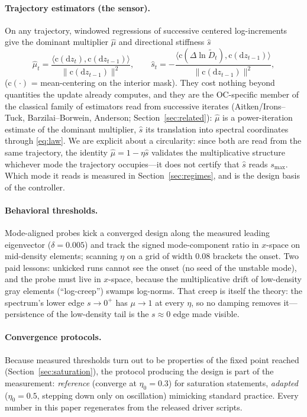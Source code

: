 \documentclass[11pt,a4paper]{article}
\newcommand{\smax}{s_{\max}}
\newcommand{\Dfilt}{\tilde{D}}
\newcommand{\muh}{\hat{\mu}}
\newcommand{\sh}{\hat{s}}
\begin{document}
\paragraph{Trajectory estimators (the sensor).} On any trajectory,
windowed regressions of successive centered log-increments give the
dominant multiplier $\muh$ and directional stiffness $\sh$
\begin{equation}
  \muh_t = \frac{\langle \mathrm c(\mathrm dz_t),\mathrm
  c(\mathrm dz_{t-1})\rangle}{\|\mathrm c(\mathrm dz_{t-1})\|^2},
  \qquad
  \sh_t = -\frac{\langle \mathrm c(\Delta\ln\Dfilt_t),\mathrm
  c(\mathrm dz_{t-1})\rangle}{\|\mathrm c(\mathrm dz_{t-1})\|^2},
  \label{eq:estimators}
\end{equation}
($\mathrm c(\cdot)$ = mean-centering on the interior mask). They cost
nothing beyond quantities the update already computes, and they are the
OC-specific member of the classical family of estimators read from
successive iterates (Aitken/Irons--Tuck, Barzilai--Borwein, Anderson;
Section~\ref{sec:related}): $\muh$ is a power-iteration estimate of the
dominant multiplier, $\sh$ its translation into spectral coordinates
through \eqref{eq:law}. We are explicit
about a circularity: since both are read from the same trajectory, the
identity $\muh=1-\eta\sh$ validates the multiplicative structure
whichever mode the trajectory occupies---it does not certify that $\sh$
reads $\smax$. Which mode it reads is measured in
Section~\ref{sec:regimes}, and is the design basis of the controller.

\paragraph{Behavioral thresholds.} Mode-aligned probes kick a converged
design along the measured leading eigenvector ($\delta=0.005$) and track
the signed mode-component ratio in $x$-space on mid-density elements;
scanning $\eta$ on a grid of width $0.08$ brackets the onset. Two paid
lessons: unkicked runs cannot see the onset (no seed of the unstable
mode), and the probe must live in $x$-space, because the multiplicative
drift of low-density gray elements (``log-creep'') swamps log-norms.
That creep is itself the theory: the spectrum's lower edge
$s\to0^{+}$ has $\mu\to1$ at every $\eta$, so no damping removes
it---persistence of the low-density tail is the $s\approx0$ edge made
visible.

\paragraph{Convergence protocols.} Because measured thresholds turn out
to be properties of the fixed point reached
(Section~\ref{sec:saturation}), the protocol producing the design is
part of the measurement: \emph{reference} (converge at $\eta_0=0.3$) for
saturation statements, \emph{adapted} ($\eta_0=0.5$, stepping down only
on oscillation) mimicking standard practice. Every number in this paper
regenerates from the released driver scripts.
\end{document}
